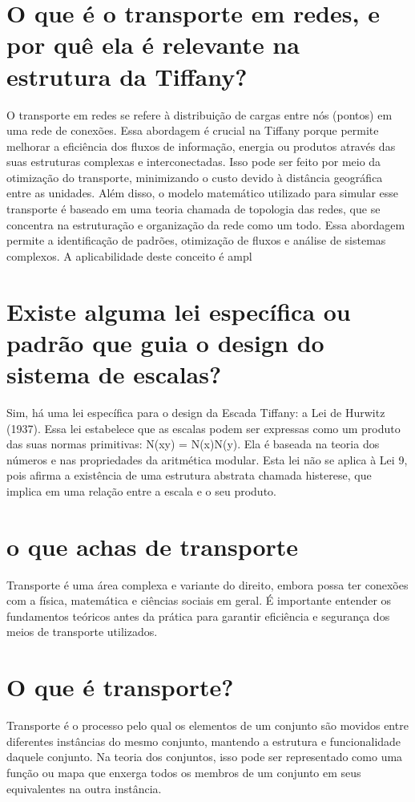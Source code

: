 \documentclass[11pt,a4paper]{article}
\begin{document}
\section{O que é o transporte em redes, e por quê ela é relevante na estrutura da Tiffany?}
O transporte em redes se refere à distribuição de cargas entre nós (pontos) em uma rede de conexões. Essa abordagem é crucial na Tiffany porque permite melhorar a eficiência dos fluxos de informação, energia ou produtos através das suas estruturas complexas e interconectadas. Isso pode ser feito por meio da otimização do transporte, minimizando o custo devido à distância geográfica entre as unidades. Além disso, o modelo matemático utilizado para simular esse transporte é baseado em uma teoria chamada de topologia das redes, que se concentra na estruturação e organização da rede como um todo. Essa abordagem permite a identificação de padrões, otimização de fluxos e análise de sistemas complexos. A aplicabilidade deste conceito é ampl

\section{Existe alguma lei específica ou padrão que guia o design do sistema de escalas?}
Sim, há uma lei específica para o design da Escada Tiffany: a Lei de Hurwitz (1937). Essa lei estabelece que as escalas podem ser expressas como um produto das suas normas primitivas: N(xy) = N(x)N(y). Ela é baseada na teoria dos números e nas propriedades da aritmética modular. Esta lei não se aplica à Lei 9, pois afirma a existência de uma estrutura abstrata chamada histerese, que implica em uma relação entre a escala e o seu produto.

\section{o que achas de transporte}
Transporte é uma área complexa e variante do direito, embora possa ter conexões com a física, matemática e ciências sociais em geral. É importante entender os fundamentos teóricos antes da prática para garantir eficiência e segurança dos meios de transporte utilizados.

\section{O que é transporte?}
Transporte é o processo pelo qual os elementos de um conjunto são movidos entre diferentes instâncias do mesmo conjunto, mantendo a estrutura e funcionalidade daquele conjunto. Na teoria dos conjuntos, isso pode ser representado como uma função ou mapa que enxerga todos os membros de um conjunto em seus equivalentes na outra instância.
\end{document}
